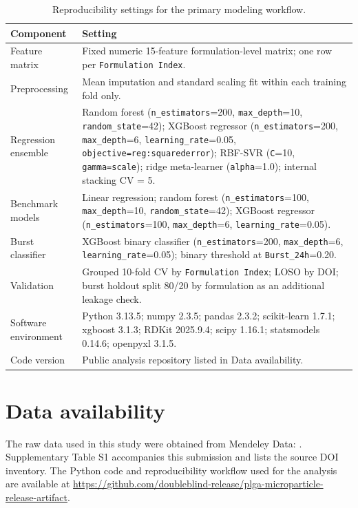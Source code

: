 \documentclass[preprint,12pt,authoryear]{elsarticle}
\begin{document}
\begin{table}[H]
\centering
\caption{Reproducibility settings for the primary modeling workflow.}
\label{tab:reproducibility_settings}
\footnotesize
\setlength{\tabcolsep}{4pt}
\renewcommand{\arraystretch}{1.15}
\begin{tabularx}{\linewidth}{p{3.0cm}Y}
\toprule
Component & Setting \\
\midrule
Feature matrix & Fixed numeric 15-feature formulation-level matrix; one row per \texttt{Formulation Index}. \\
Preprocessing & Mean imputation and standard scaling fit within each training fold only. \\
Regression ensemble & Random forest (\texttt{n\_estimators}=200, \texttt{max\_depth}=10, \texttt{random\_state}=42); XGBoost regressor (\texttt{n\_estimators}=200, \texttt{max\_depth}=6, \texttt{learning\_rate}=0.05, \texttt{objective=reg:squarederror}); RBF-SVR (\texttt{C}=10, \texttt{gamma=scale}); ridge meta-learner (\texttt{alpha}=1.0); internal stacking CV = 5. \\
Benchmark models & Linear regression; random forest (\texttt{n\_estimators}=100, \texttt{max\_depth}=10, \texttt{random\_state}=42); XGBoost regressor (\texttt{n\_estimators}=100, \texttt{max\_depth}=6, \texttt{learning\_rate}=0.05). \\
Burst classifier & XGBoost binary classifier (\texttt{n\_estimators}=200, \texttt{max\_depth}=6, \texttt{learning\_rate}=0.05); binary threshold at \texttt{Burst\_24h}=0.20. \\
Validation & Grouped 10-fold CV by \texttt{Formulation Index}; LOSO by DOI; burst holdout split 80/20 by formulation as an additional leakage check. \\
Software environment & Python 3.13.5; numpy 2.3.5; pandas 2.3.2; scikit-learn 1.7.1; xgboost 3.1.3; RDKit 2025.9.4; scipy 1.16.1; statsmodels 0.14.6; openpyxl 3.1.5. \\
Code version & Public analysis repository listed in Data availability. \\
\bottomrule
\end{tabularx}
\end{table}

\section*{Data availability}
The raw data used in this study were obtained from Mendeley Data: \cite{Bao2024Dataset}. Supplementary Table S1 accompanies this submission and lists the source DOI inventory. The Python code and reproducibility workflow used for the analysis are available at \href{https://github.com/doubleblind-release/plga-microparticle-release-artifact}{https://github.com/doubleblind-release/plga-microparticle-release-artifact}.
\end{document}
